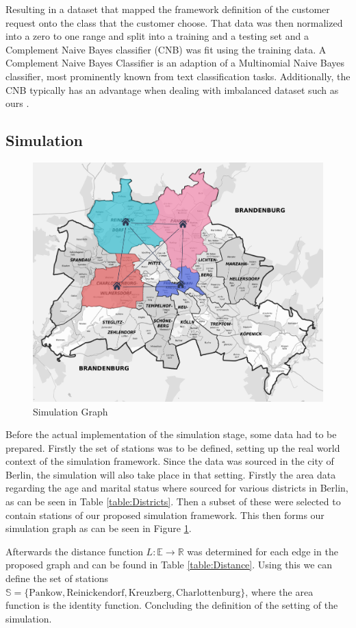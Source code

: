 Resulting in a dataset that mapped the framework definition of the customer request onto the class that the customer choose.
That data was then normalized into a zero to one range and split into a
training and a testing set and a Complement Naive Bayes classifier (CNB) was fit using
the training data. A Complement Naive Bayes Classifier is an adaption of a Multinomial Naive Bayes classifier, most
prominently known from text classification tasks. Additionally, the CNB typically has an advantage when dealing
with imbalanced dataset such as ours \cite{rennie2003tackling}.


\subsection{Simulation}
\label{sub_sec:CaseStudy/Simulation}

\begin{figure}[htbp]
  \centering
  \includegraphics[width=.5\linewidth]{./Figures/graph.png}
  \caption{Simulation Graph}
  \label{fig:Graph}
\end{figure}
Before the actual implementation of the simulation stage, some data had to be prepared. Firstly 
the set of stations was to be defined, setting up the real world context of the simulation 
framework. Since the data was sourced in the city of Berlin, the simulation will also take place
in that setting. Firstly the area data regarding the age and marital status where sourced for various
districts in Berlin, as can be seen in Table \ref{table:Districts}. Then a subset of these were selected
to contain stations of our proposed simulation framework. This then forms our simulation graph as can be
seen in Figure \ref{fig:Graph}.


Afterwards the distance function $L: \mathbb{E} \to \mathbb{R}$ was determined for each edge in the proposed graph and can be found
in Table \ref{table:Distance}. Using this we can define the set of stations $\mathbb{S} = \{ \text{Pankow}, \text{Reinickendorf}, \text{Kreuzberg}, \text{Charlottenburg} \}$,
where the area function is the identity function. Concluding the definition of the setting of the simulation.


